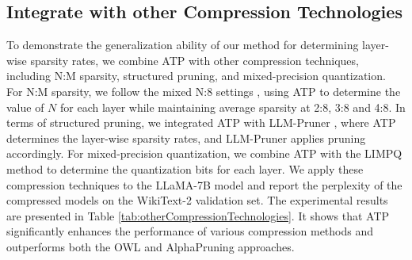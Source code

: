 \subsection{Integrate with other Compression Technologies}\label{sec:other_Compression_Technologies}
To demonstrate the generalization ability of our method for determining layer-wise sparsity rates, we combine ATP with other compression techniques, including N:M sparsity, structured pruning, and mixed-precision quantization. For N:M sparsity, we follow the mixed N:8 settings \citep{sun2021dominosearch}, using ATP to determine the value of \(N\) for each layer while maintaining average sparsity at 2:8, 3:8 and 4:8. In terms of structured pruning, we integrated ATP with LLM-Pruner \citep{ma2023llm}, where ATP determines the layer-wise sparsity rates, and LLM-Pruner applies pruning accordingly. For mixed-precision quantization, we combine ATP with the LIMPQ method \citep{tang2022mixed} to determine the quantization bits for each layer. We apply these compression techniques to the LLaMA-7B model and report the perplexity of the compressed models on the WikiText-2 validation set. The experimental results are presented in Table \ref{tab:otherCompressionTechnologies}. It shows that ATP significantly enhances the performance of various compression methods and outperforms both the OWL and AlphaPruning approaches.
